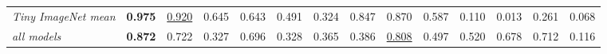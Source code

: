\begin{table}[htbp]
\begin{adjustbox}{max width=\linewidth}
\begin{tabular}{lrrrrrrrrrrrrr}
\rowcolor{black!8}\emph{Tiny ImageNet mean} & \textbf{0.975} & \underline{0.920} & 0.645 & 0.643 & \textcolor{black!45}{0.491} & \textcolor{black!45}{0.324} & 0.847 & 0.870 & 0.587 & \textcolor{black!45}{0.110} & \textcolor{black!45}{0.013} & \textcolor{black!45}{0.261} & \textcolor{black!45}{0.068} \\
\rowcolor{black!8}\emph{all models} & \textbf{0.872} & 0.722 & \textcolor{black!45}{0.327} & 0.696 & \textcolor{black!45}{0.328} & \textcolor{black!45}{0.365} & \textcolor{black!45}{0.386} & \underline{0.808} & \textcolor{black!45}{0.497} & 0.520 & 0.678 & 0.712 & \textcolor{black!45}{0.116} \\
\bottomrule
\end{tabular}
\end{adjustbox}
\end{table}

